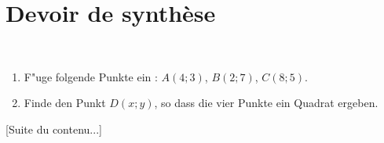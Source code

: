 \documentclass[10pt,openany]{book}
\begin{document}
\pagestyle{empty}
\section*{Devoir de synth\`ese}

\\
\begin{enumerate}
\item F"uge folgende Punkte ein : $A(4;3)$, $B(2;7)$, $C(8;5)$.
\item Finde den Punkt $D(x;y)$, so dass die vier Punkte ein Quadrat ergeben.
\end{enumerate}

[Suite du contenu...]
\end{document}

